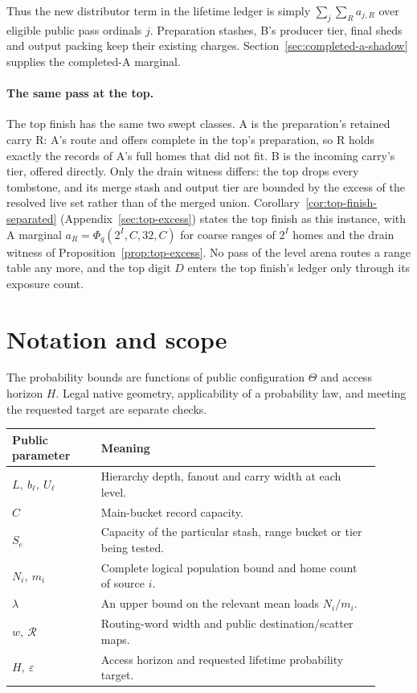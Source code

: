 \documentclass[11pt]{article}
\theoremstyle{definition}
\theoremstyle{remark}
\begin{document}
Thus the new distributor term in the lifetime ledger is simply
$\sum_j\sum_R a_{j,R}$ over eligible public pass ordinals $j$.
Preparation stashes, B's producer tier, final sheds and output packing keep
their existing charges. Section~\ref{sec:completed-a-shadow} supplies the completed-A marginal.

\paragraph{The same pass at the top.}
The top finish has the same two swept classes. A is the preparation's
retained carry R: A's route and offers complete in the top's preparation,
so R holds exactly the records of A's full homes that did not fit. B is
the incoming carry's tier, offered directly. Only the drain witness
differs: the top drops every tombstone, and its merge stash and output
tier are bounded by the excess of the resolved live set rather than of the
merged union. Corollary~\ref{cor:top-finish-separated}
(Appendix~\ref{sec:top-excess}) states the top finish as this instance,
with A marginal $a_R=\Phi_q(2^I,C,32,C)$ for coarse ranges of $2^I$ homes
and the drain witness of Proposition~\ref{prop:top-excess}. No pass of the
level arena routes a range table any more, and the top digit $D$ enters the
top finish's ledger only through its exposure count.

\section{Notation and scope}
The probability bounds are functions of public configuration $\Theta$ and
access horizon $H$. Legal native geometry, applicability of a probability
law, and meeting the requested target are separate checks.
\begin{center}\small
\begin{tabular}{p{0.22\linewidth}p{0.69\linewidth}}
\toprule
Public parameter & Meaning\\
\midrule
$L,\ b_\ell,\ U_\ell$ & Hierarchy depth, fanout and carry width at each level.\\
$C$ & Main-bucket record capacity.\\
$S_e$ & Capacity of the particular stash, range bucket or tier being tested.\\
$N_i,\ m_i$ & Complete logical population bound and home count of source $i$.\\
$\lambda$ & An upper bound on the relevant mean loads $N_i/m_i$.\\
$w,\ \mathcal R$ & Routing-word width and public destination/scatter maps.\\
$H,\ \varepsilon$ & Access horizon and requested lifetime probability target.\\
\bottomrule
\end{tabular}
\end{center}
\end{document}

